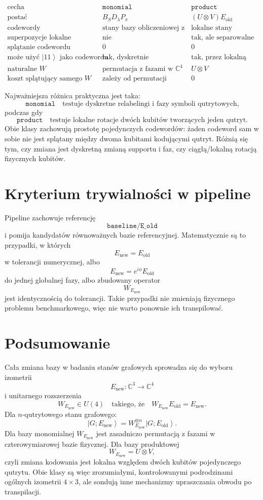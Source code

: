 \documentclass[11pt,a4paper]{article}
\newcommand{\C}{\mathbb{C}}
\newcommand{\Eold}{E_{\mathrm{old}}}
\newcommand{\Enew}{E_{\mathrm{new}}}
\newcommand{\ket}[1]{\left|#1\right\rangle}
\begin{document}
\[
\begin{array}{c|c|c}
    \text{cecha} & \texttt{monomial} & \texttt{product}\\
    \hline
    \text{postać} &
    B_SD_\lambda P_\pi &
    (U\otimes V)\Eold\\
    \text{codewordy} &
    \text{stany bazy obliczeniowej z fazami} &
    \text{lokalne stany produktowe}\\
    \text{superpozycje lokalne} &
    \text{nie} &
    \text{tak, ale separowalne}\\
    \text{splątanie codewordu} &
    0 &
    0\\
    \text{może użyć }\ket{11}\text{ jako codewordu} &
    \text{tak, dyskretnie} &
    \text{tak, przez lokalną rotację}\\
    \text{naturalne }W &
    \text{permutacja z fazami w }\C^4 &
    U\otimes V\\
    \text{koszt splątujący samego }W &
    \text{zależy od permutacji} &
    0
\end{array}
\]

Najważniejsza różnica praktyczna jest taka:
\[
    \texttt{monomial}
    \quad
    \text{testuje dyskretne relabelingi i fazy symboli qutrytowych,}
\]
podczas gdy
\[
    \texttt{product}
    \quad
    \text{testuje lokalne rotacje dwóch kubitów tworzących jeden qutryt.}
\]
Obie klasy zachowują prostotę pojedynczych codewordów: żaden codeword sam w
sobie nie jest splątany między dwoma kubitami kodującymi qutryt. Różnią się
tym, czy zmiana jest dyskretną zmianą supportu i faz, czy ciągłą/lokalną
rotacją fizycznych kubitów.

\section{Kryterium trywialności w pipeline}

Pipeline zachowuje referencję
\[
    \texttt{baseline}/\texttt{E\_old}
\]
i pomija kandydatów równoważnych bazie referencyjnej. Matematycznie są to
przypadki, w których
\[
    \Enew=\Eold
\]
w tolerancji numerycznej, albo
\[
    \Enew=e^{i\phi}\Eold
\]
do jednej globalnej fazy, albo zbudowany operator
\[
    W_{\Enew}
\]
jest identycznością do tolerancji. Takie przypadki nie zmieniają fizycznego
problemu benchmarkowego, więc nie warto ponownie ich transpilować.

\section{Podsumowanie}

Cała zmiana bazy w badaniu stanów grafowych sprowadza się do wyboru izometrii
\[
    \Enew:\C^3\to\C^4
\]
i unitarnego rozszerzenia
\[
    W_{\Enew}\in U(4)
    \quad\text{takiego, że}\quad
    W_{\Enew}\Eold=\Enew.
\]
Dla \(n\)-qutrytowego stanu grafowego:
\[
    \boxed{
    \ket{G;\Enew}
    =
    W_{\Enew}^{\otimes n}\ket{G;\Eold}
    }.
\]
Dla bazy monomialnej \(W_{\Enew}\) jest zasadniczo permutacją z fazami w
czterowymiarowej bazie fizycznej. Dla bazy produktowej
\[
    W_{\Enew}=U\otimes V,
\]
czyli zmiana kodowania jest lokalna względem dwóch kubitów pojedynczego
qutrytu. Obie klasy są więc zrozumiałymi, kontrolowanymi podrodzinami ogólnych
izometrii \(4\times 3\), ale sondują inne mechanizmy upraszczania obwodu po
transpilacji.
\end{document}
